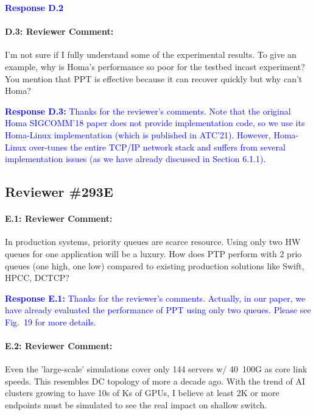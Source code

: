 \documentclass[12pt,one-column]{article}
\begin{document}
\noindent\textcolor{blue}{\textbf{Response D.2}
} 


{\it \paragraph{D.3: Reviewer Comment:} I'm not sure if I fully understand some of the experimental results. To give an example, why is Homa's performance so poor for the testbed incast experiment? You mention that PPT is effective because it can recover quickly but why can't Homa?}


\noindent\textcolor{blue}{\textbf{Response D.3:}
Thanks for the reviewer's comments.
Note that the original Homa SIGCOMM'18 paper does not provide implementation code, so we use its Homa-Linux implementation (which is published in ATC'21).
However, Homa-Linux over-tunes the entire TCP/IP network stack and suffers from several implementation issues (as we have already discussed in Section 6.1.1).
}

\subsection{Reviewer \#293E}

{\it \paragraph{E.1: Reviewer Comment:} In production systems, priority queues are scarce resource. Using only two HW queues for one application will be a luxury. How does PTP perform with 2 prio queues (one high, one low) compared to existing production solutions like Swift, HPCC, DCTCP?}

\noindent\textcolor{blue}{\textbf{Response E.1:}
Thanks for the reviewer’s comments. 
Actually, in our paper, we have already evaluated the performance of PPT using only two queues. Please see Fig.~19 for more details.
}

{\it \paragraph{E.2: Reviewer Comment:} Even the 'large-scale' simulations cover only 144 servers w/ 40~100G as core link speeds. This resembles DC topology of more a decade ago. With the trend of AI clusters growing to have 10s of Ks of GPUs, I believe at least 2K or more endpoints must be simulated to see the real impact on shallow switch.}
\end{document}
